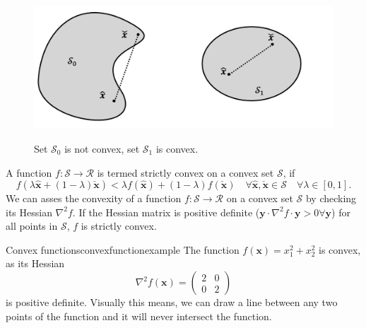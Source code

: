 \begin{figure}[!htpb]
    \centering
    \includegraphics[width=\textwidth, alt={Convex sets}]{figures/convex_sets.png}
    \caption{Set $\mathcal{S}_0$ is not convex, set $\mathcal{S}_1$ is convex.}
    \label{fig:convex_sets}
\end{figure}

A function $f: \mathcal{S} \rightarrow \mathcal{R}$ is termed strictly convex on a convex set $\mathcal{S}$, if 
\begin{equation}
    f(\lambda \hat{\mathbf{x}} + (1-\lambda) \check{\mathbf{x}}) <  \lambda f(\hat{\mathbf{x}}) + (1-\lambda) f(\check{\mathbf{x}}) \quad \forall \hat{\mathbf{x}}, \check{\mathbf{x}} \in \mathcal{S} \quad  \forall \lambda \in [0,1].
\end{equation}
We can asses the convexity of a function $f: \mathcal{S} \rightarrow \mathcal{R}$ on a convex set $\mathcal{S}$ by checking its Hessian $\nabla^2 f$. If the Hessian matrix is positive definite ($\mathbf{y} \cdot \nabla^2 f \cdot  \mathbf{y} > 0 \forall \mathbf{y}$) for all points in $\mathcal{S}$,  $f$ is strictly convex.

\begin{example}{Convex functions}{convexfunctionexample}
    The function $f(\mathbf{x})=x_1^2 + x_2^2$ is convex, as its Hessian \begin{equation}
        \nabla^2f(\mathbf{x}) = 
        \begin{pmatrix}
        2 & 0 \\ 
        0       & 2         
        \end{pmatrix}
    \end{equation} 
    is positive definite. Visually this means, we can draw a line between any two points of the function and it will never intersect the function.

    
\end{example}


